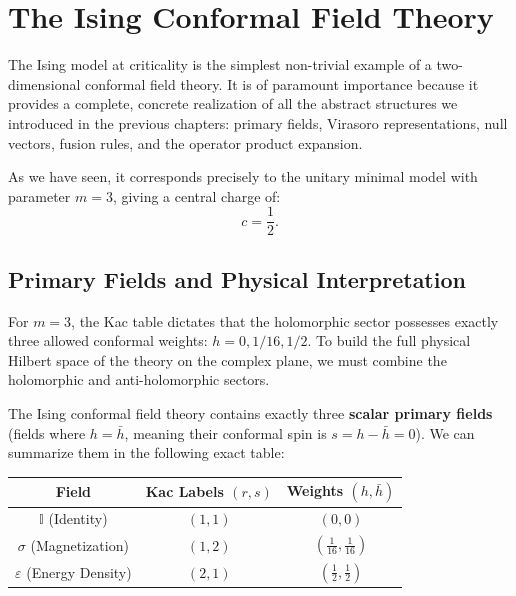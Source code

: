 \section{The Ising Conformal Field Theory}

The Ising model at criticality is the simplest non-trivial example of a two-dimensional conformal field theory. It is of paramount importance because it provides a complete, concrete realization of all the abstract structures we introduced in the previous chapters: primary fields, Virasoro representations, null vectors, fusion rules, and the operator product expansion.

As we have seen, it corresponds precisely to the unitary minimal model with parameter \(m = 3\), giving a central charge of:
\[
    c = \frac{1}{2}.
\]

\subsection{Primary Fields and Physical Interpretation}

For \(m=3\), the Kac table dictates that the holomorphic sector possesses exactly three allowed conformal weights: \(h = 0, 1/16, 1/2\). To build the full physical Hilbert space of the theory on the complex plane, we must combine the holomorphic and anti-holomorphic sectors.

The Ising conformal field theory contains exactly three \textbf{scalar primary fields} (fields where \(h = \bar{h}\), meaning their conformal spin is \(s = h - \bar{h} = 0\)). We can summarize them in the following exact table:

\begin{table}[H]
    \centering
    \begin{tabular}{ccc}
        \toprule
        \textbf{Field}                   & \textbf{Kac Labels} \((r,s)\) & \textbf{Weights} \((h, \bar{h})\)           \\
        \midrule
        \(\mathbb{I}\) (Identity)        & \((1,1)\)                     & \((0, 0)\)                                  \\
        \(\sigma\) (Magnetization)       & \((1,2)\)                     & \(\left(\frac{1}{16}, \frac{1}{16}\right)\) \\
        \(\varepsilon\) (Energy Density) & \((2,1)\)                     & \(\left(\frac{1}{2}, \frac{1}{2}\right)\)   \\
        \bottomrule
    \end{tabular}
\end{table}

